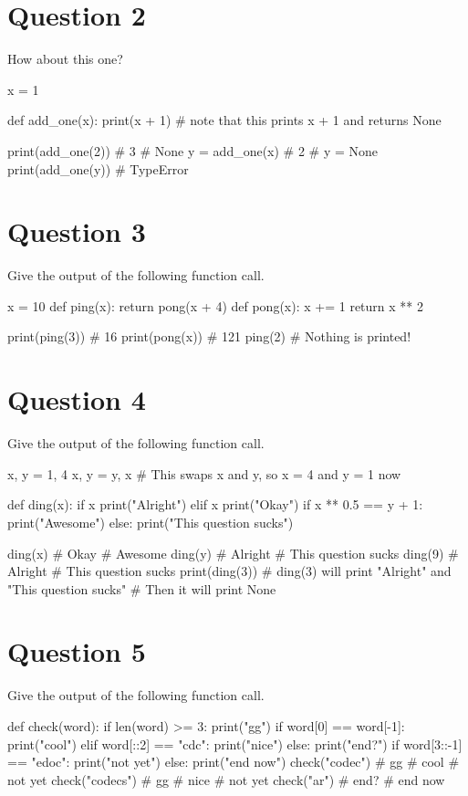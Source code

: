 \section{Question 2}
How about this one?
\begin{python}
x = 1

def add_one(x):
    print(x + 1)    # note that this prints x + 1 and returns None

print(add_one(2))   # 3
                    # None
y = add_one(x)      # 2
                    # y = None
print(add_one(y))   # TypeError
\end{python}

\section{Question 3}
Give the output of the following function call.
\begin{python}
x = 10
def ping(x):
    return pong(x + 4)
def pong(x):
    x += 1
    return x ** 2
  
print(ping(3))  # 16
print(pong(x))  # 121
ping(2)         # Nothing is printed!
\end{python}

\section{Question 4}
Give the output of the following function call.
\begin{python}
x, y = 1, 4
x, y = y, x     # This swaps x and y, so x = 4 and y = 1 now

def ding(x):
    if x %
        print("Alright")
    elif x %
        print("Okay")
    if x ** 0.5 == y + 1:
        print("Awesome")
    else:
        print("This question sucks")

ding(x)         # Okay
                # Awesome
ding(y)         # Alright
                # This question sucks
ding(9)         # Alright
                # This question sucks
print(ding(3))  # ding(3) will print "Alright" and "This question sucks"
                # Then it will print None
\end{python}

\section{Question 5}
Give the output of the following function call.
\begin{python}
def check(word):
    if len(word) >= 3:
        print("gg")
    if word[0] == word[-1]:
        print("cool")
    elif word[::2] == "cdc":
        print("nice")
    else:
        print("end?")
    if word[3::-1] == "edoc":
        print("not yet")
    else:
        print("end now")
check("codec")      # gg
                    # cool
                    # not yet
check("codecs")     # gg
                    # nice
                    # not yet
check("ar")         # end?
                    # end now
\end{python}

